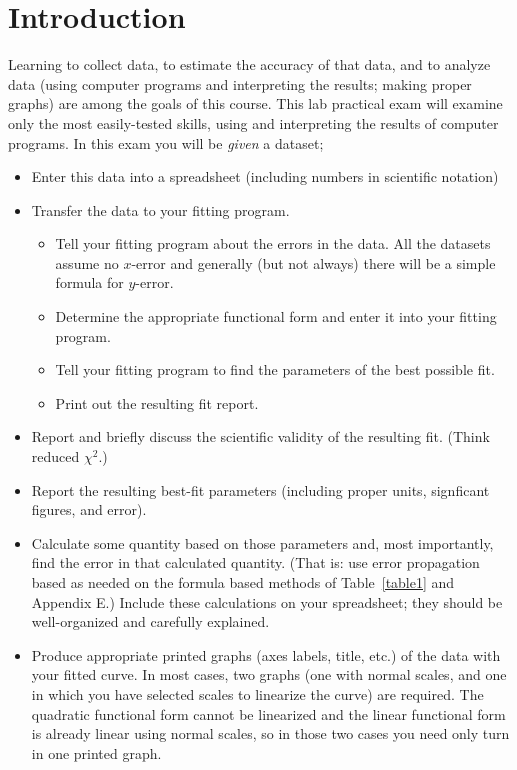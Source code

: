 \newexp

\section*{Introduction}

Learning to collect  data, to estimate the accuracy of that data, and to
analyze data (using computer programs and interpreting the results; making proper graphs) are
among the goals of this course.  This lab practical exam will examine
only the most easily-tested skills, using and interpreting the results
of computer programs.  In this exam you will be {\em given} a dataset; %

\begin{itemize}
\item Enter this data into a spreadsheet (including numbers in scientific notation) 
\item Transfer the data to your fitting program.  
\begin{itemize}
\item Tell your fitting program about the errors in the data. All the datasets
assume no $x$-error and generally (but not always) there will be a simple formula for $y$-error.
\item  Determine the appropriate functional form and enter it into your fitting program.
\item Tell your fitting program to find the parameters of the best possible fit.
\item Print out the resulting fit report.
\end{itemize}
\item Report and briefly discuss the scientific validity of the resulting fit.  (Think reduced $\chi^2$.)
\item Report the resulting best-fit parameters (including proper units, signficant figures, and error).
\item Calculate some quantity based on those parameters and, most importantly,
find the error in that calculated quantity. (That is: use error propagation based as needed on the formula based methods of Table~\ref{table1} and
Appendix E.)  Include these calculations on your spreadsheet; they should be well-organized and carefully explained.
\item Produce appropriate  printed graphs (axes labels, title, etc.) of the data with your fitted curve.
In most cases, two graphs (one with normal scales, and one in which you have selected scales 
to linearize the curve) are required.  The quadratic functional form cannot be linearized
and the linear functional form is already linear using normal scales, so in those two cases you need only turn in one printed graph.
\end{itemize}

